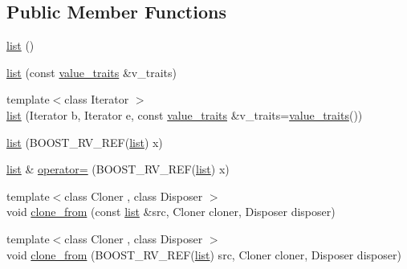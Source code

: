 \subsection*{Public Member Functions}
\begin{DoxyCompactItemize}
\item 
\hyperlink{classboost_1_1intrusive_1_1list_acf7cd5a0ce708aa2a2e43a677383ce3d}{list} ()
\item 
\hyperlink{classboost_1_1intrusive_1_1list_a1fdd256ce8cea0dda5b0a3166f6a30e2}{list} (const \hyperlink{classboost_1_1intrusive_1_1list_aed9db2882c7567d4600fce5dda67c0ab}{value\+\_\+traits} \&v\+\_\+traits)
\item 
{\footnotesize template$<$class Iterator $>$ }\\\hyperlink{classboost_1_1intrusive_1_1list_a0465fd895d60bb9b4e7a4cc57aeae020}{list} (Iterator b, Iterator e, const \hyperlink{classboost_1_1intrusive_1_1list_aed9db2882c7567d4600fce5dda67c0ab}{value\+\_\+traits} \&v\+\_\+traits=\hyperlink{classboost_1_1intrusive_1_1list_aed9db2882c7567d4600fce5dda67c0ab}{value\+\_\+traits}())
\item 
\hyperlink{classboost_1_1intrusive_1_1list_a92f4f5f8207fccb75d232beee75ec74f}{list} (B\+O\+O\+S\+T\+\_\+\+R\+V\+\_\+\+R\+EF(\hyperlink{classboost_1_1intrusive_1_1list}{list}) x)
\item 
\hyperlink{classboost_1_1intrusive_1_1list}{list} \& \hyperlink{classboost_1_1intrusive_1_1list_a8f26181bcd829be5c6c8588b75745a2d}{operator=} (B\+O\+O\+S\+T\+\_\+\+R\+V\+\_\+\+R\+EF(\hyperlink{classboost_1_1intrusive_1_1list}{list}) x)
\item 
{\footnotesize template$<$class Cloner , class Disposer $>$ }\\void \hyperlink{classboost_1_1intrusive_1_1list_abd5a0ff454d12980a7854763f7787925}{clone\+\_\+from} (const \hyperlink{classboost_1_1intrusive_1_1list}{list} \&src, Cloner cloner, Disposer disposer)
\item 
{\footnotesize template$<$class Cloner , class Disposer $>$ }\\void \hyperlink{classboost_1_1intrusive_1_1list_a385d08ac3e61f67a63671ec827f39a39}{clone\+\_\+from} (B\+O\+O\+S\+T\+\_\+\+R\+V\+\_\+\+R\+EF(\hyperlink{classboost_1_1intrusive_1_1list}{list}) src, Cloner cloner, Disposer disposer)
\end{DoxyCompactItemize}

